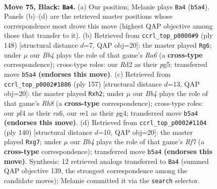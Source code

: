 \documentclass[11pt]{article}
\begin{document}
\clearpage

\begin{figure}[p]\centering
\begin{subfigure}{0.46\textwidth}\centering
\resizebox{\linewidth}{!}{%
\newchessgame
\chessboard[
  setfen={8/p7/P6k/1b3p2/5P2/8/3r4/4R2K b - - 1 75},
  showmover=false,
  pgfstyle=straightmove, color=movearrow, markmove={b5-a4}
]}
\caption{}
\end{subfigure}\hfill
\begin{subfigure}{0.46\textwidth}\centering
\resizebox{\linewidth}{!}{%
\newchessgame
\chessboard[
  setfen={8/3k4/R7/p5p1/P7/6pP/3r4/6K1 w - - 0 75},
  showmover=false,
  pgfstyle=straightmove, color=movearrow, markmove={a6-g6}
]}
\caption{}
\end{subfigure}
\\[4pt]
\begin{subfigure}{0.46\textwidth}\centering
\resizebox{\linewidth}{!}{%
\newchessgame
\chessboard[
  setfen={8/6k1/R7/6p1/6P1/7p/4KP1P/7r b - - 0 79},
  showmover=false,
  pgfstyle=straightmove, color=movearrow, markmove={h1-h2}
]}
\caption{}
\end{subfigure}\hfill
\begin{subfigure}{0.46\textwidth}\centering
\resizebox{\linewidth}{!}{%
\newchessgame
\chessboard[
  setfen={8/5Rpp/8/r3k3/8/3K3P/6P1/8 w - - 0 71},
  showmover=false,
  pgfstyle=straightmove, color=movearrow, markmove={f7-g7}
]}
\caption{}
\end{subfigure}
\caption{\textbf{Move 75, Black: \texttt{Ba4}.} (a) Our position; Melanie plays \texttt{Ba4} (\texttt{b5a4}). Panels (b)--(d) are the retrieved master positions whose correspondence most drove this move (highest QAP objective among those that transfer to it). (b) Retrieved from \texttt{ccrl\_top\_p0000\#9} (ply 148) [structural distance $d$=7, QAP obj=20]: the master played \texttt{Rg6}; under $\mu$ our \emph{Bb4} plays the role of that game's \emph{Ra6} (a \textbf{cross-type} correspondence); cross-type roles: our \emph{R}d2 as their \emph{p}g5; transferred move \texttt{b5a4} \textbf{(endorses this move)}. (c) Retrieved from \texttt{ccrl\_top\_p0002\#1886} (ply 157) [structural distance $d$=13, QAP obj=20]: the master played \texttt{Rxh2}; under $\mu$ our \emph{Bb4} plays the role of that game's \emph{Rh8} (a \textbf{cross-type} correspondence); cross-type roles: our \emph{p}f4 as their \emph{r}a6, our \emph{r}e1 as their \emph{p}g4; transferred move \texttt{b5a4} \textbf{(endorses this move)}. (d) Retrieved from \texttt{ccrl\_top\_p0002\#1104} (ply 140) [structural distance $d$=10, QAP obj=20]: the master played \texttt{Rxg7}; under $\mu$ our \emph{Bb4} plays the role of that game's \emph{Rf7} (a \textbf{cross-type} correspondence); transferred move \texttt{b5a4} \textbf{(endorses this move)}. Synthesis: 12 retrieved analogs transferred to \texttt{Ba4} (summed QAP objective 139, the strongest correspondence among the candidate moves); Melanie committed it via the \texttt{search} selector.}
\label{fig:thought-m149}
\end{figure}
\end{document}
